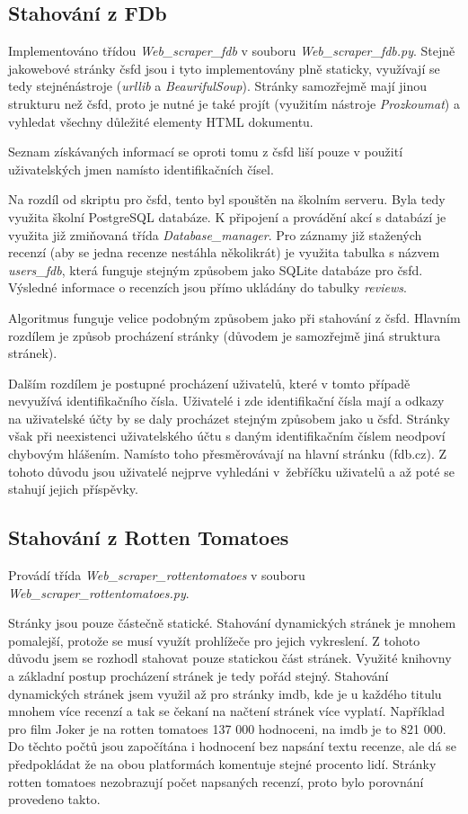 \subsection{Stahování z FDb}
Implementováno třídou \emph{Web\_scraper\_fdb} v souboru \emph{Web\_scraper\_fdb.py}. Stejně jako\linebreak webové stránky čsfd jsou i tyto implementovány plně staticky, využívají se tedy stejné\linebreak nástroje (\emph{urllib} a \emph{BeaurifulSoup}). Stránky samozřejmě mají jinou strukturu než čsfd, proto je nutné je také projít (využitím nástroje \emph{Prozkoumat}) a vyhledat všechny důležité elementy HTML dokumentu. 

Seznam získávaných informací se oproti tomu z čsfd liší pouze v použití uživatelských jmen namísto identifikačních čísel.

Na rozdíl od skriptu pro čsfd, tento byl spouštěn na školním serveru. Byla tedy využita školní PostgreSQL databáze. K připojení a provádění akcí s databází je využita již zmiňovaná třída \emph{Database\_manager}. Pro záznamy již stažených recenzí (aby se jedna recenze nestáhla několikrát) je využita tabulka s názvem \emph{users\_fdb}, která funguje stejným způsobem jako SQLite databáze pro čsfd. Výsledné informace o recenzích jsou přímo ukládány do tabulky \emph{reviews}. 

Algoritmus funguje velice podobným způsobem jako při stahování z čsfd. Hlavním rozdílem je způsob procházení stránky (důvodem je samozřejmě jiná struktura stránek). 

Dalším rozdílem je postupné procházení uživatelů, které v tomto případě nevyužívá identifikačního čísla. Uživatelé i zde identifikační čísla mají a odkazy na uživatelské účty by se daly procházet stejným způsobem jako u čsfd. Stránky však při neexistenci uživatelského účtu s daným identifikačním číslem neodpoví chybovým hlášením. Namísto toho přesměrovávají na hlavní stránku (fdb.cz). Z tohoto důvodu jsou uživatelé nejprve vyhledáni v~žebříčku uživatelů a až poté se stahují jejich příspěvky.



\subsection{Stahování z Rotten Tomatoes}
Provádí třída \emph{Web\_scraper\_rottentomatoes} v souboru \emph{Web\_scraper\_rottentomatoes.py}.

Stránky jsou pouze částečně statické. 
Stahování dynamických stránek je mnohem pomalejší, protože se musí využít prohlížeče pro jejich vykreslení. Z tohoto důvodu jsem se rozhodl stahovat pouze statickou část stránek. Využité knihovny a základní postup procházení stránek je tedy pořád stejný. Stahování dynamických stránek jsem využil až pro stránky imdb, kde je u každého titulu mnohem více recenzí a tak se čekaní na načtení stránek více vyplatí. Například pro film Joker je na rotten tomatoes 137 000 hodnoceni, na imdb je to 821 000. Do těchto počtů jsou započítána i hodnocení bez napsání textu recenze, ale dá se předpokládat že na obou platformách komentuje stejné procento lidí. Stránky rotten tomatoes nezobrazují počet napsaných recenzí, proto bylo porovnání provedeno takto.

